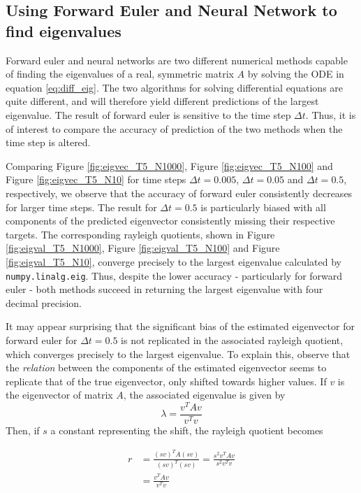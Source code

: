 \documentclass[12pt]{extarticle}
\def\code#1{\texttt{#1}}
\begin{document}
\subsection*{Using Forward Euler and Neural Network to find eigenvalues}
Forward euler and neural networks are two different numerical methods capable of finding the eigenvalues of a real, symmetric matrix $A$ by solving the ODE in equation \eqref{eq:diff_eig}. The two algorithms for solving differential equations are quite different, and will therefore yield different predictions of the largest eigenvalue. The result of forward euler is sensitive to the time step $\Delta t$. Thus, it is of interest to compare the accuracy of prediction of the two methods when the time step is altered. 

Comparing Figure \ref{fig:eigvec_T5_N1000}, Figure \ref{fig:eigvec_T5_N100} and Figure \ref{fig:eigvec_T5_N10} for time steps $\Delta t = 0.005$, $\Delta t = 0.05$ and $\Delta t = 0.5$, respectively, we observe that the accuracy of forward euler consistently decreases for larger time steps. The result for $\Delta t=0.5$ is particularly biased with all components of the predicted eigenvector consistently missing their respective targets. The corresponding rayleigh quotients, shown in Figure \ref{fig:eigval_T5_N1000}, Figure \ref{fig:eigval_T5_N100} and Figure \ref{fig:eigval_T5_N10}, converge precisely to the largest eigenvalue calculated by \code{numpy.linalg.eig}. Thus, despite the lower accuracy - particularly for forward euler - both methods succeed in returning the largest eigenvalue with four decimal precision.

It may appear surprising that the significant bias of the estimated eigenvector for forward euler for $\Delta t =0.5$ is not replicated in the associated rayleigh quotient, which converges precisely to the largest eigenvalue. To explain this, observe that the \textit{relation} between the components of the estimated eigenvector seems to replicate that of the true eigenvector, only shifted towards higher values. If $v$ is the eigenvector of matrix $A$, the associated eigenvalue is given by
\[ \lambda = \frac{v^T A v}{v^T v} \]
Then, if $s$ a constant representing the shift, the rayleigh quotient becomes

\begin{align*}
	r &= \frac{(sv)^T A (sv)}{(sv)^T (sv)} = \frac{s^2 v^T A v}{s^2 v^T v} \\
	&= \frac{v^T A v}{v^T v}
\end{align*}
\end{document}
